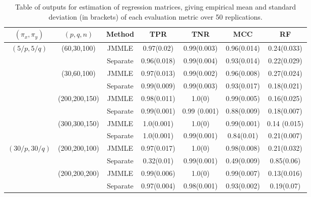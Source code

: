 \begin{scriptsize}
\begin{table}
    \begin{tabular}{ccccccc}
    \hline
    $(\pi_x, \pi_y)$ & $(p,q,n)$   & Method   & TPR            & TNR            & MCC & RF            \\ \hline
    $(5/p, 5/q)$   & (60,30,100)   & JMMLE    & 0.97(0.02)  & 0.99(0.003)  & 0.96(0.014) & 0.24(0.033) \\
    ~              & ~             & Separate & 0.96(0.018) & 0.99(0.004)  & 0.93(0.014) & 0.22(0.029) \\\cline{2-7}
    ~              & (30,60,100)   & JMMLE    & 0.97(0.013) & 0.99(0.002)  & 0.96(0.008) & 0.27(0.024) \\
    ~              & ~             & Separate & 0.99(0.009) & 0.99(0.003)  & 0.93(0.017) & 0.18(0.021) \\\cline{2-7}
    ~              & (200,200,150) & JMMLE    & 0.98(0.011) & 1.0(0)       & 0.99(0.005) & 0.16(0.025) \\
    ~              & ~             & Separate & 0.99(0.001) & 0.99 (0.001) & 0.88(0.009) & 0.18(0.007) \\\cline{2-7}
    ~              & (300,300,150) & JMMLE    & 1.0(0.001)  & 1.0(0)       & 0.99(0.001) & 0.14 (0.015)\\
    ~              & ~             & Separate & 1.0(0.001)  & 0.99(0.001)  & 0.84(0.01)  & 0.21(0.007)\\\hline
    $(30/p, 30/q)$ & (200,200,100) & JMMLE    & 0.97(0.017) & 1.0(0)       & 0.98(0.008) & 0.21(0.032) \\
    ~              & ~             & Separate & 0.32(0.01)  & 0.99(0.001)  & 0.49(0.009) & 0.85(0.06)  \\\cline{2-7}
    ~              & (200,200,200) & JMMLE    & 0.99(0.006) & 1.0(0)       & 0.99(0.007) & 0.13(0.016) \\
    ~              & ~             & Separate & 0.97(0.004) & 0.98(0.001)  & 0.93(0.002) & 0.19(0.07)  \\    \hline
    \end{tabular}
    \caption{Table of outputs for estimation of regression matrices, giving empirical mean and standard deviation (in brackets) of each evaluation metric over 50 replications.}
    \label{table:simtable11}
\end{table}


\end{scriptsize}
